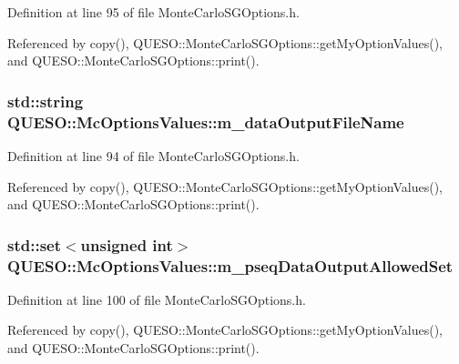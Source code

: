Definition at line 95 of file Monte\-Carlo\-S\-G\-Options.\-h.



Referenced by copy(), Q\-U\-E\-S\-O\-::\-Monte\-Carlo\-S\-G\-Options\-::get\-My\-Option\-Values(), and Q\-U\-E\-S\-O\-::\-Monte\-Carlo\-S\-G\-Options\-::print().

\hypertarget{class_q_u_e_s_o_1_1_mc_options_values_a67247424cb0b327fc1b4d6f067ce449c}{
\subsubsection[{m\-\_\-data\-Output\-File\-Name}]{\setlength{\rightskip}{0pt plus 5cm}std\-::string Q\-U\-E\-S\-O\-::\-Mc\-Options\-Values\-::m\-\_\-data\-Output\-File\-Name}}\label{class_q_u_e_s_o_1_1_mc_options_values_a67247424cb0b327fc1b4d6f067ce449c}


Definition at line 94 of file Monte\-Carlo\-S\-G\-Options.\-h.



Referenced by copy(), Q\-U\-E\-S\-O\-::\-Monte\-Carlo\-S\-G\-Options\-::get\-My\-Option\-Values(), and Q\-U\-E\-S\-O\-::\-Monte\-Carlo\-S\-G\-Options\-::print().

\hypertarget{class_q_u_e_s_o_1_1_mc_options_values_a264ab755cc81477580ef59ad7ffcd7e7}{
\subsubsection[{m\-\_\-pseq\-Data\-Output\-Allowed\-Set}]{\setlength{\rightskip}{0pt plus 5cm}std\-::set$<$unsigned int$>$ Q\-U\-E\-S\-O\-::\-Mc\-Options\-Values\-::m\-\_\-pseq\-Data\-Output\-Allowed\-Set}}\label{class_q_u_e_s_o_1_1_mc_options_values_a264ab755cc81477580ef59ad7ffcd7e7}


Definition at line 100 of file Monte\-Carlo\-S\-G\-Options.\-h.



Referenced by copy(), Q\-U\-E\-S\-O\-::\-Monte\-Carlo\-S\-G\-Options\-::get\-My\-Option\-Values(), and Q\-U\-E\-S\-O\-::\-Monte\-Carlo\-S\-G\-Options\-::print().

